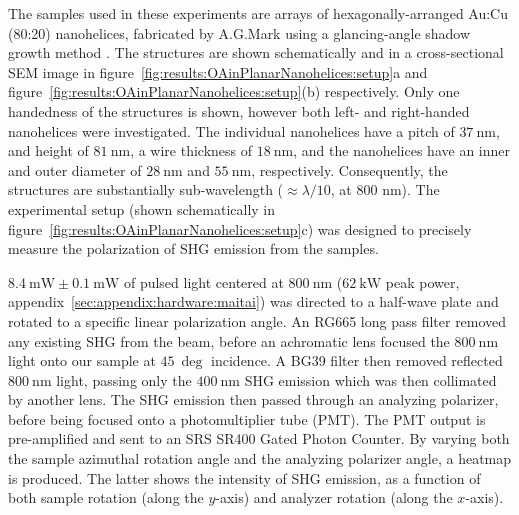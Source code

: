 The samples used in these experiments are arrays of hexagonally-arranged Au:Cu (80:20) nanohelices, fabricated by A.G.Mark using a glancing-angle shadow growth method \cite{Gibbs2014}. The structures are shown schematically and in a cross-sectional SEM image in figure~\ref{fig:results:OAinPlanarNanohelices:setup}a and figure~\ref{fig:results:OAinPlanarNanohelices:setup}(b) respectively. 
Only one handedness of the structures is shown, however both left- and right-handed nanohelices were investigated. The individual nanohelices have a pitch of $\SI{37}{\nano\m}$, and height of $\SI{81}{\nano\m}$, a wire thickness of $\SI{18}{\nano\m}$, and the nanohelices have an inner and outer diameter of $\SI{28}{\nano\m}$ and $\SI{55}{\nano\m}$, respectively. Consequently, the structures are substantially sub-wavelength ($\approx\lambda/10$, at 800 nm).
The experimental setup (shown schematically in figure~\ref{fig:results:OAinPlanarNanohelices:setup}c) was designed to precisely measure the polarization of SHG emission from the samples. 

$\SI{8.4}{\milli\watt}\pm\SI{0.1}{\milli\watt}$ of pulsed light centered at $\SI{800}{\nano\m}$ ($\SI{62}{\kilo\watt}$ peak power, appendix~\ref{sec:appendix:hardware:maitai}) was directed to a half-wave plate and rotated to a specific linear polarization angle. An RG665 long pass filter removed any existing SHG from the beam, before an achromatic lens focused the $\SI{800}{\nano\m}$ light onto our sample at $\SI{45}{\deg}$ incidence. A BG39 filter then removed reflected $\SI{800}{\nano\m}$ light, passing only the $\SI{400}{\nano\m}$ SHG emission which was then collimated by another lens. The SHG emission then passed through an analyzing polarizer, before being focused onto a photomultiplier tube (PMT). The PMT output is pre-amplified and sent to an SRS SR400 Gated Photon Counter. 
By varying both the sample azimuthal rotation angle and the analyzing polarizer angle, a heatmap is produced. The latter shows the intensity of SHG emission, as a function of both sample rotation (along the $y$-axis) and analyzer rotation (along the $x$-axis). 

